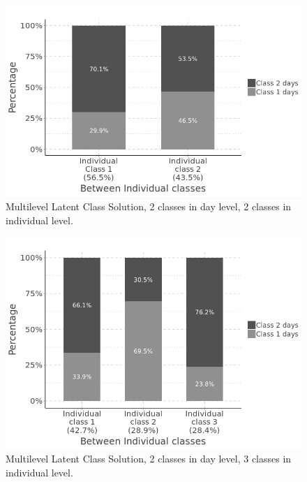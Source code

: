 \begin{figure}[H]
	\centering
	\includegraphics[width=13cm]{Figures/CW2CB2.png}
	\decoRule
	\caption[Multilevel Latent Class Solution (2 $\times$ 2).]{Multilevel Latent Class Solution, 2 classes in day level, 2 classes in individual level.}
	\label{fig:diary1}
\end{figure}




\begin{figure}[H]
	\centering
	\includegraphics[width=13cm]{Figures/CW2CB3.png}
	\decoRule
	\caption[Multilevel Latent Class Solution (2 $\times$ 3).]{Multilevel Latent Class Solution, 2 classes in day level, 3 classes in individual level.}
	\label{fig:diary1}
\end{figure}


